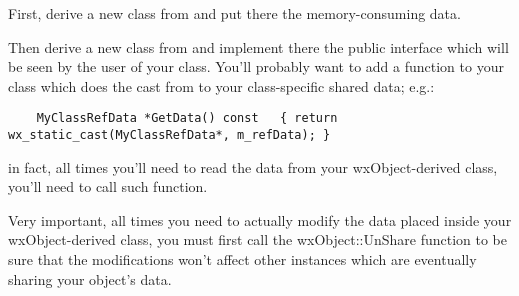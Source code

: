 First, derive a new class from  and
put there the memory-consuming data.

Then derive a new class from  and implement there
the public interface which will be seen by the user of your class.
You'll probably want to add a function to your class which does the cast from
 to your class-specific shared data; e.g.:

\begin{verbatim}
    MyClassRefData *GetData() const   { return wx_static_cast(MyClassRefData*, m_refData); }
\end{verbatim}

in fact, all times you'll need to read the data from your wxObject-derived class,
you'll need to call such function.

Very important, all times you need to actually modify the data placed inside your
wxObject-derived class, you must first call the wxObject::UnShare
function to be sure that the modifications won't affect other instances which are
eventually sharing your object's data.

